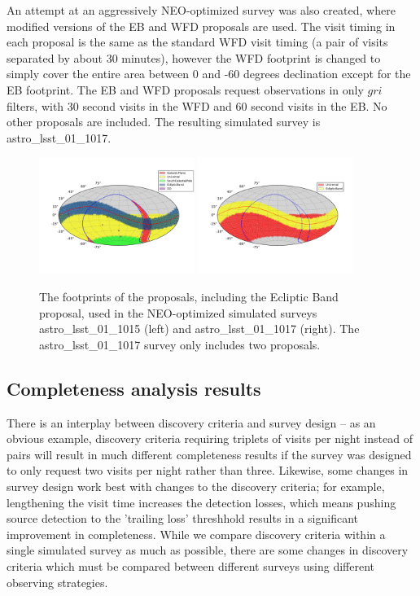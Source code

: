 An attempt at an aggressively NEO-optimized survey was also created, where modified versions of the EB and WFD proposals are used. The visit timing in each proposal is the same as the standard WFD visit timing (a pair of visits separated by about 30 minutes), however the WFD footprint is changed to simply cover the entire area between 0 and -60 degrees declination except for the EB footprint. The EB and WFD proposals request observations in only $gri$ filters, with 30 second visits in the WFD and 60 second visits in the EB. No other proposals are included. The resulting simulated survey is astro\_lsst\_01\_1017. 

\begin{figure}
\centering
\includegraphics[width=0.45\textwidth]{figures/astro_lsst_01_1015_proposal_footprint}
\includegraphics[width=0.45\textwidth]{figures/astro_lsst_01_1017_proposal_footprint}
\caption{The footprints of the proposals, including the Ecliptic Band proposal, used in the NEO-optimized simulated surveys astro\_lsst\_01\_1015 (left) and astro\_lsst\_01\_1017 (right). The astro\_lsst\_01\_1017 survey only includes two proposals.
\label{fig:neo_footprints}}
\end{figure}


\subsection{Completeness analysis results}

There is an interplay between discovery criteria and survey design -- as an obvious example, discovery criteria requiring triplets of visits per night instead of pairs will result in much different completeness results if the survey was designed to only request two visits per night rather than three. Likewise, some changes in survey design work best with changes to the discovery criteria; for example, lengthening the visit time increases the detection losses, which means pushing source detection to the 'trailing loss' threshhold results in a significant improvement in completeness. While we compare discovery criteria within a single simulated survey as much as possible, there are some changes in discovery criteria which must be compared between different surveys using different observing strategies.

